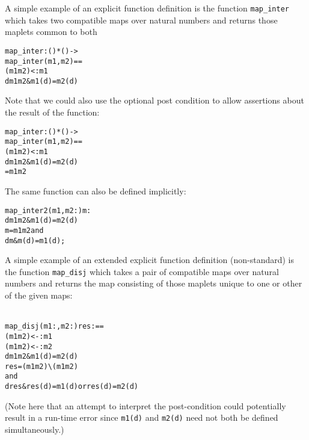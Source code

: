 \documentclass[\pformat,12pt]{article}
\begin{document}
A simple example of an explicit function definition is the function
\texttt{map\_inter} which takes two compatible maps over natural
numbers and returns those maplets common to both
\begin{alltt}
  map_inter: () * () -> 
  map_inter (m1,m2) ==
    ( m1   m2) <: m1
    d  m1  m2 & m1(d) = m2(d)
\end{alltt}
Note that we could also use the optional post condition to allow
assertions about the result of the function:
\begin{alltt}
  map_inter: () * () -> 
  map_inter (m1,m2) ==
    ( m1   m2) <: m1
    d  m1  m2 & m1(d) = m2(d)
     =  m1   m2
\end{alltt}

The same function can also be defined implicitly:
\begin{alltt}
  map_inter2 (m1,m2: ) m: 
    d  m1  m2 & m1(d) = m2(d)
    m =  m1  m2 and
        d  m & m(d) = m1(d);
\end{alltt}

A simple example of an extended explicit function definition
(non-standard) is the function \texttt{map\_disj} which takes a pair of
compatible maps over natural numbers and returns the map consisting of
those maplets unique to one or other of the given maps:

\begin{alltt}\label{mapdisj}
  map_disj (m1:,m2:) res :  ==
    ( m1  m2) <-: m1 
    ( m1  m2) <-: m2
    d  m1  m2 & m1(d) = m2(d)
    res = ( m1  m2) \verb+\+ ( m1  m2) 
       and
        d  res & res(d) = m1(d) or res(d) = m2(d)
\end{alltt}
(Note here that an attempt to interpret the post-condition could
potentially result in a run-time error since \texttt{m1(d)} and
\texttt{m2(d)} need not both be defined simultaneously.)
\end{document}
